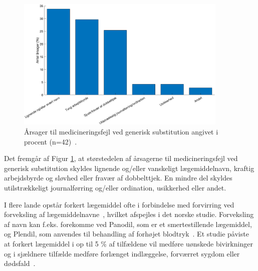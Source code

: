 \vspace{-0.2cm}
\begin{figure}[H]\centering	\includegraphics[width=0.9\textwidth]{billeder/GenSubbb.png} 
	\caption{Årsager til medicineringsfejl ved generisk substitution angivet i procent (n=42)~\citep{Hakonsen2010}.}	\label{fig:GeneriskSubstitution1}  
\end{figure}
\vspace{-1cm}

Det fremgår af Figur \ref{fig:GeneriskSubstitution1}, at størstedelen af årsagerne til medicineringsfejl ved generisk substitution skyldes lignende og/eller vanskeligt lægemiddelnavn, kraftig arbejdsbyrde og sløvhed eller fravær af dobbelttjek. En mindre del skyldes utilstrækkeligt journalførring og/eller ordination, usikkerhed eller andet. 

%

I flere lande opstår forkert lægemiddel ofte i forbindelse med forvirring ved forveksling af lægemiddelnavne~\citep{DanskSelskabforPatientsikkerhed2009}, hvilket afspejles i det norske studie. Forveksling af navn kan f.eks. forekomme ved Panodil, som er et smertestillende lægemiddel, og Plendil, som anvendes til behandling af forhøjet blodtryk~\citep{DanskSelskabforPatientsikkerhed2009}. Et studie påviste at forkert lægemiddel i op til 5 \% af tilfældene vil medføre uønskede bivirkninger~\citep{Basco2010} og i sjældnere tilfælde medføre forlænget indlæggelse, forværret sygdom eller dødsfald~\citep{DanskSelskabforPatientsikkerhed2009}.

